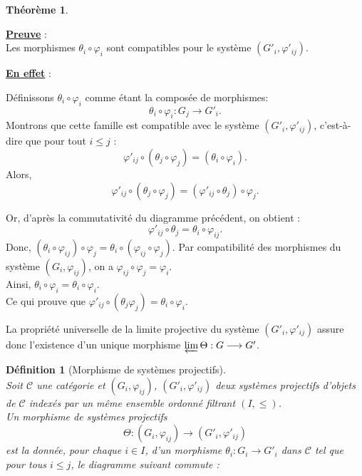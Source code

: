 \documentclass[a4paper, 14pt]{report}
\newtheorem{definition}{Définition}[section]
\newtheorem{theorem}{Théorème}[section]
\begin{document}
\begin{onehalfspace}
{\begin{theorem}
	
\end{theorem}


\textbf{\underline{Preuve}} : \\
Les morphismes $\theta_i \circ \varphi_i$ sont compatibles pour le système $(G'_i, \varphi'_{ij})$.

\textbf{\underline{En effet}} :

Définissons $\theta_i \circ \varphi_i$ comme étant la composée de morphismes:
\[
\theta_i \circ \varphi_i : G_j \to G'_i.
\]
Montrons que cette famille est compatible avec le système $(G'_i, \varphi'_{ij})$, c'est-à-dire que pour tout $i \leq j$ :
\[
\varphi'_{ij} \circ (\theta_j \circ \varphi_j) = (\theta_i \circ \varphi_i).
\]	
Alors, 
\[
\varphi'_{ij} \circ (\theta_j \circ \varphi_j) = (\varphi'_{ij} \circ \theta_j) \circ \varphi_j.
\]

Or, d’après la commutativité du diagramme précédent, on obtient :
\[
\varphi'_{ij} \circ \theta_j = \theta_i \circ \varphi_{ij}.
\]
Donc, \((\theta_i \circ \varphi_{ij}) \circ \varphi_j = \theta_i \circ (\varphi_{ij} \circ \varphi_j).\)
Par compatibilité des morphismes du système $(G_i, \varphi_{ij})$, on a
\(\varphi_{ij} \circ \varphi_j = \varphi_i.\) \\
Ainsi,
\(
\theta_i \circ \varphi_i = \theta_i \circ \varphi_i.
\) \\
Ce qui prouve que 
\(
\varphi'_{ij} \circ (\theta_j \varphi_j) = \theta_i \circ \varphi_i.
\)

La propriété universelle de la limite projective du système $(G'_i, \varphi'_{ij})$ assure donc l'existence d'un unique morphisme $\varprojlim \Theta : G \longrightarrow G'$.





\newpage
\begin{definition}[Morphisme de systèmes projectifs] \cite{guglielmetti2025profinite} \leavevmode\\
	Soit $\mathcal{C}$ une catégorie et $(G_i, \varphi_{ij})$, $(G'_i, \varphi'_{ij})$ deux systèmes projectifs d'objets de $\mathcal{C}$ indexés par un même ensemble ordonné filtrant $(I, \leq)$. \\
	Un \emph{morphisme de systèmes projectifs} 
	\[
	\Theta : (G_i, \varphi_{ij}) \longrightarrow (G'_i, \varphi'_{ij})
	\]
	est la donnée, pour chaque $i \in I$, d’un morphisme $\theta_i : G_i \to G'_i$ dans $\mathcal{C}$ tel que pour tous $i \leq j$, le diagramme suivant commute :
	

\end{definition}}
\end{onehalfspace}
\end{document}
